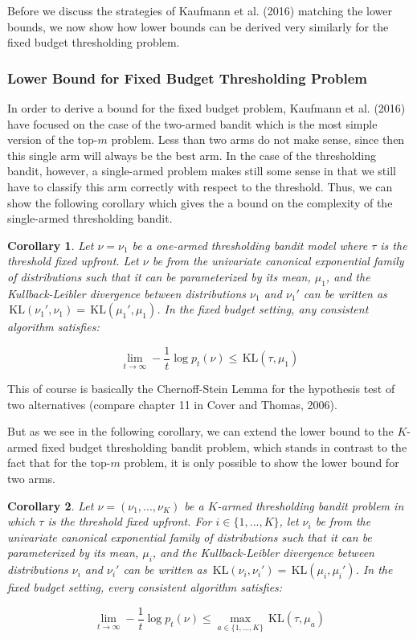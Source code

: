 \documentclass[11pt,]{article}
\newtheorem{corollary}{Corollary}
\newcommand{\KL}{\,\text{KL}}
\begin{document}
Before we discuss the strategies of Kaufmann et al. (2016) matching the
lower bounds, we now show how lower bounds can be derived very similarly
for the fixed budget thresholding problem.

\subsubsection{Lower Bound for Fixed Budget Thresholding
Problem}\label{lower-bound-for-fixed-budget-thresholding-problem}

In order to derive a bound for the fixed budget problem, Kaufmann et al.
(2016) have focused on the case of the two-armed bandit which is the
most simple version of the top-\(m\) problem. Less than two arms do not
make sense, since then this single arm will always be the best arm. In
the case of the thresholding bandit, however, a single-armed problem
makes still some sense in that we still have to classify this arm
correctly with respect to the threshold. Thus, we can show the following
corollary which gives the a bound on the complexity of the single-armed
thresholding bandit.

\begin{corollary}
Let $\nu = \nu_1$ be a one-armed thresholding bandit model where $\tau$ is the threshold fixed upfront. Let $\nu$ be from the univariate canonical exponential family of distributions such that it can be parameterized by its mean, $\mu_1$, and the Kullback-Leibler divergence between distributions $\nu_1$ and $\nu_1'$ can be written as $\KL(\nu_1', \nu_1) = \KL(\mu_1', \mu_1)$. In the fixed budget setting, any consistent algorithm satisfies:

$$
\lim_{t \rightarrow \infty}- \frac{1}{t} \log p_t(\nu) \leq \KL(\tau, \mu_1)
$$
\end{corollary}

This of course is basically the Chernoff-Stein Lemma for the hypothesis
test of two alternatives (compare chapter 11 in Cover and Thomas, 2006).

But as we see in the following corollary, we can extend the lower bound
to the \(K\)-armed fixed budget thresholding bandit problem, which
stands in contrast to the fact that for the top-\(m\) problem, it is
only possible to show the lower bound for two arms.

\begin{corollary}
Let $\nu = (\nu_1, ..., \nu_K)$ be a $K$-armed thresholding bandit problem in which $\tau$ is the threshold fixed upfront. For $i \in \{1,...,K\}$, let $\nu_i$ be from the univariate canonical exponential family of distributions such that it can be parameterized by its mean, $\mu_i$, and the Kullback-Leibler divergence between distributions $\nu_i$ and $\nu_i'$ can be written as $\KL(\nu_i, \nu_i') = \KL(\mu_i, \mu_i')$. In the fixed budget setting, every consistent algorithm satisfies:

$$
\lim_{t \rightarrow \infty} -\frac{1}{t} \log p_t(\nu) \leq \max_{a \in \{1,...,K\}} \KL(\tau, \mu_a)
$$
\end{corollary}
\end{document}
